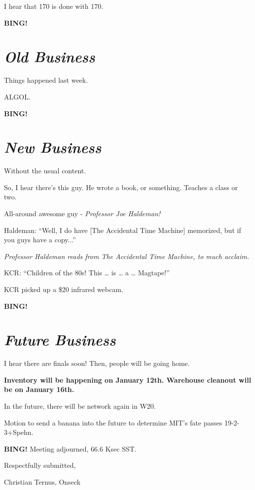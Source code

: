 \documentclass[10pt]{article}
\newcommand{\bing}{{\bf BING!} }
\newcommand{\goto}[1]{\bing \vskip 12pt \section*{{\em{#1}}}}
\begin{document}
I hear that 170 is done with 170.

\goto{Old Business}

Things happened last week.

ALGOL.

\goto{New Business}

Without the usual content.

So, I hear there's this guy.  He wrote a book, or something.  Teaches a class or two.

All-around awesome guy - \emph{Professor Joe Haldeman!}

Haldeman:  ``Well, I do have [The Accidental Time Machine] memorized, but if you guys have a copy...''

\emph{Professor Haldeman reads from The Accidental Time Machine, to much acclaim.}

KCR:  ``Children of the 80s!  This \ldots{} is \ldots{} a \ldots{} Magtape!''

KCR picked up a \$20 infrared webcam.

\goto{Future Business}

I hear there are finals soon!  Then, people will be going home.

\textbf{Inventory will be happening on January 12th.  Warehouse cleanout will be on January 16th.}

In the future, there will be network again in W20.

Motion to send a banana into the future to determine MIT's fate passes 19-2-3+Spehn.

\bing
\noindent
Meeting adjourned, 66.6 Ksec SST.

\vspace{18pt}

\centerline{Respectfully submitted,}
\centerline{Christian Ternus, Onseck}
\end{document}
